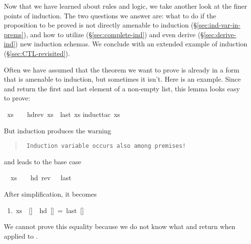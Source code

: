 %
\begin{isabellebody}%
\def\isabellecontext{AdvancedInd}%
%
\begin{isamarkuptext}%
\noindent
Now that we have learned about rules and logic, we take another look at the
finer points of induction. The two questions we answer are: what to do if the
proposition to be proved is not directly amenable to induction
(\S\ref{sec:ind-var-in-prems}), and how to utilize (\S\ref{sec:complete-ind})
and even derive (\S\ref{sec:derive-ind}) new induction schemas. We conclude
with an extended example of induction (\S\ref{sec:CTL-revisited}).%
\end{isamarkuptext}%
%
%
\begin{isamarkuptext}%
\label{sec:ind-var-in-prems}
Often we have assumed that the theorem we want to prove is already in a form
that is amenable to induction, but sometimes it isn't.
Here is an example.
Since  and  return the first and last element of a
non-empty list, this lemma looks easy to prove:%
\end{isamarkuptext}%
\ {\isachardoublequote}xs\ {\isasymnoteq}\ {\isacharbrackleft}{\isacharbrackright}\ {\isasymLongrightarrow}\ hd{\isacharparenleft}rev\ xs{\isacharparenright}\ {\isacharequal}\ last\ xs{\isachardoublequote}\isanewline
{}induct{\isacharunderscore}tac\ xs{\isacharparenright}%
\begin{isamarkuptxt}%
\noindent
But induction produces the warning
\begin{quote}\tt
Induction variable occurs also among premises!
\end{quote}
and leads to the base case
\begin{isabelle}%
\ {}{\isachardot}\ xs\ {\isasymnoteq}\ {\isacharbrackleft}{\isacharbrackright}\ {\isasymLongrightarrow}\ hd\ {\isacharparenleft}rev\ {\isacharbrackleft}{\isacharbrackright}{\isacharparenright}\ {\isacharequal}\ last\ {\isacharbrackleft}{\isacharbrackright}%
\end{isabelle}
After simplification, it becomes
\begin{isabelle}
\ 1.\ xs\ {\isasymnoteq}\ []\ {\isasymLongrightarrow}\ hd\ []\ =\ last\ []
\end{isabelle}
We cannot prove this equality because we do not know what  and
 return when applied to \isa{{\isacharbrackleft}{\isacharbrackright}}.


\end{isamarkuptxt}
\end{isabellebody}
